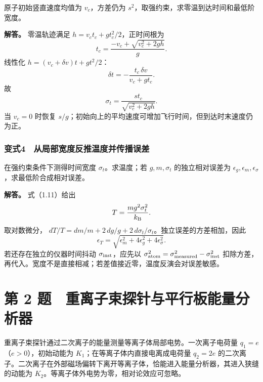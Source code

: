 \documentclass[12pt,a4paper,fontset=fandol]{ctexart}
\begin{document}
原子初始竖直速度均值为 \(v_c\)，方差仍为
\(s^2\)，取强约束，求零温到达时间和最低阶宽度。

\textbf{解答。} 零温轨迹满足 \(h=v_ct_c+gt_c^2/2\)，正时间根为 \[
t_c=\frac{-v_c+\sqrt{v_c^2+2gh}}{g}.
\] 线性化 \(h=(v_c+\delta v)t+gt^2/2\)： \[
\delta t=-\frac{t_c\,\delta v}{v_c+gt_c}.
\] 故 \[
\boxed{\sigma_t=\frac{st_c}{\sqrt{v_c^2+2gh}}.}
\] 当 \(v_c=0\) 时恢复
\(s/g\)；初始向上的平均速度可增加飞行时间，但到达时末速度仍为正。

\subsubsection{变式4　从局部宽度反推温度并传播误差}\label{ux53d8ux5f0f4-ux4eceux5c40ux90e8ux5bbdux5ea6ux53cdux63a8ux6e29ux5ea6ux5e76ux4f20ux64adux8befux5dee}

在强约束条件下测得时间宽度 \(\sigma_t\)。求温度；若 \(g,m,\sigma_t\)
的独立相对误差为
\(\epsilon_g,\epsilon_m,\epsilon_\sigma\)，求最低阶合成相对误差。

\textbf{解答。} 式（1.11）给出 \[
T=\frac{mg^2\sigma_t^2}{k_{\rm B}}.
\] 取对数微分，
\(dT/T=dm/m+2\,dg/g+2\,d\sigma_t/\sigma_t\)。独立误差的方差相加，因此 \[
\boxed{\epsilon_T=
\sqrt{\epsilon_m^2+4\epsilon_g^2+4\epsilon_\sigma^2}.}
\] 若还存在独立的仪器时间抖动 \(\sigma_{\rm inst}\)，应先以
\(\sigma_{\rm atom}^2=\sigma_{\rm measured}^2-\sigma_{\rm inst}^2\)
扣除方差，再代入。宽度不是直接相减；若差值接近零，温度反演会对误差敏感。

\clearpage

\section{第 2
题　重离子束探针与平行板能量分析器}\label{ux7b2c-2-ux9898-ux91cdux79bbux5b50ux675fux63a2ux9488ux4e0eux5e73ux884cux677fux80fdux91cfux5206ux6790ux5668}

重离子束探针通过二次离子的能量测量等离子体局部电势。一次离子电荷量
\(q_1=e\)（\(e>0\)），初始动能为 \(K_1\)；在等离子体内直接电离成电荷量
\(q_2=2e\)
的二次离子。二次离子在外部磁场偏转下离开等离子体，恰能进入能量分析器，其进入狭缝的动能为
\(K_2\)。等离子体外电势为零，相对论效应可忽略。
\end{document}
